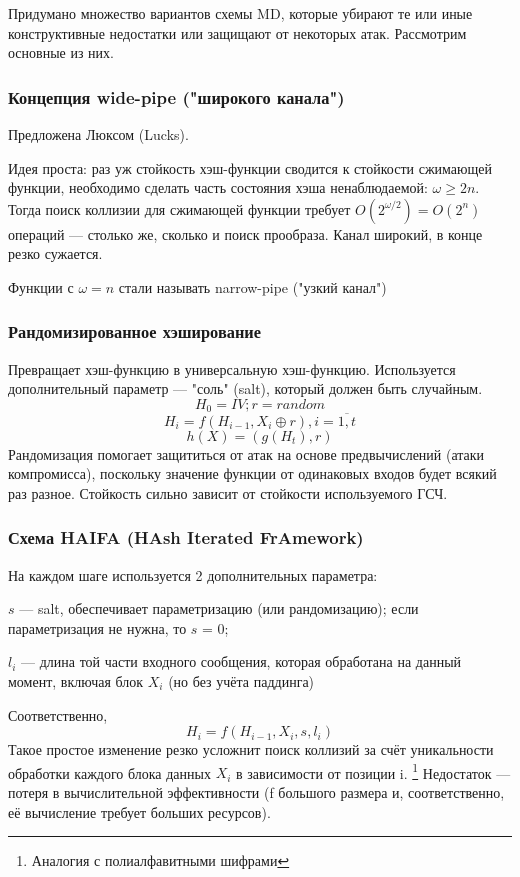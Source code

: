 Придумано множество вариантов схемы MD, которые убирают те или иные
конструктивные недостатки или защищают от некоторых атак. Рассмотрим
основные из них.

\subsubsection{Концепция wide-pipe ("широкого канала")}
Предложена Люксом (Lucks).

Идея проста: раз уж стойкость хэш-функции сводится к стойкости сжимающей
функции, необходимо сделать часть состояния хэша ненаблюдаемой: $\omega
\geq 2n$. Тогда поиск коллизии для сжимающей функции требует $O(2^{\omega / 2})
= O(2^{n})$ операций --- столько же, сколько и поиск прообраза. Канал
широкий, в конце резко сужается.

Функции с $\omega = n$ стали называть narrow-pipe ("узкий канал")

\subsubsection{Рандомизированное хэширование}
Превращает хэш-функцию в универсальную хэш-функцию. Используется дополнительный
параметр --- "соль" (salt), который должен быть случайным.
\[H_{0} = IV; r = random\]
\[H_{i} = f(H_{i-1}, X_{i} \oplus r), i = \overline{1,t} \]
\[h(X) = (g(H_{t}), r) \]
Рандомизация помогает защититься от атак на основе предвычислений (атаки
компромисса), поскольку значение функции от одинаковых входов будет
всякий раз разное. Стойкость сильно зависит от стойкости используемого ГСЧ.

\subsubsection{Схема HAIFA (HAsh Iterated FrAmework)}
На каждом шаге используется 2 дополнительных параметра:

$s$ --- salt, обеспечивает параметризацию (или рандомизацию); если параметризация
не нужна, то $s$ = 0;

$l_{i}$ --- длина той части входного сообщения, которая обработана на данный
момент, включая блок $X_{i}$ (но без учёта паддинга)

Соответственно,
\[ H_{i} = f(H_{i - 1}, X_{i}, s, l_{i}) \]
Такое простое изменение резко усложнит поиск коллизий за счёт уникальности
обработки каждого блока данных $X_{i}$ в зависимости от позиции i. 
\footnote{Аналогия с полиалфавитными шифрами} Недостаток --- потеря в
вычислительной эффективности (f большого размера и, соответственно, её
вычисление требует больших ресурсов).

